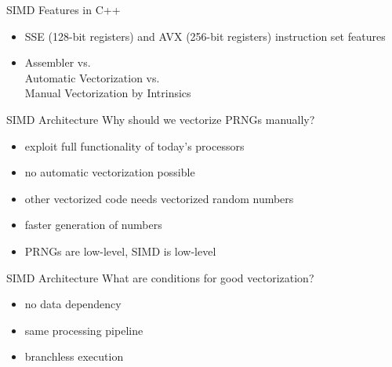 \documentclass[aspectratio=169]{beamer}
\newcommand{\inputCodeBlock}[1]{%
    \begin{center}
        
    \end{center}
}
\begin{document}
    \begin{frame}{SIMD Features in C++}
      \begin{minipage}[c]{0.49\textwidth}
        \begin{itemize}
          \item SSE (128-bit registers) and AVX (256-bit registers) instruction set features
          \item Assembler vs. \\ Automatic Vectorization vs. \\ Manual Vectorization by Intrinsics
        \end{itemize}
      \end{minipage}
      \hfill
      \begin{minipage}{0.49\textwidth}
        \inputCodeBlock{code/intel_simd.cpp}
      \end{minipage}
    \end{frame}

    \begin{frame}{SIMD Architecture}
      Why should we vectorize PRNGs manually?
      \begin{itemize}
        \item exploit full functionality of today's processors
        \item no automatic vectorization possible
        \item other vectorized code needs vectorized random numbers
        \item faster generation of numbers
        \item PRNGs are low-level, SIMD is low-level
      \end{itemize}
    \end{frame}

    \begin{frame}{SIMD Architecture}
      What are conditions for good vectorization?
      \begin{itemize}
        \item no data dependency
        \item same processing pipeline
        \item branchless execution
      \end{itemize}
    \end{frame}
\end{document}
